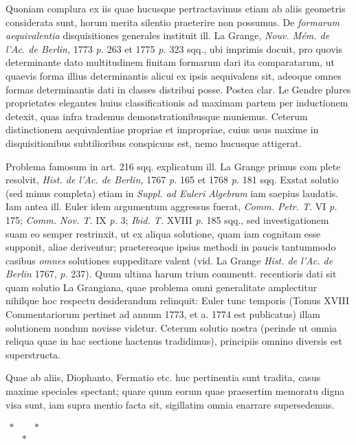 Quoniam complura ex iis quae hucusque pertractavimus etiam ab aliis geometris
considerata sunt, horum merita silentio praeterire non possumus. De \textit{formarum
aequivalentia} disquisitiones generales instituit ill. La Grange, \textit{Nouv.
M\'em. de l'Ac. de Berlin,} 1773 \textit{p.} 263 et 1775 \textit{p.} 323 sqq.,
ubi imprimis docuit, pro quovis determinante dato multitudinem finitam formarum
dari ita comparatarum, ut quaevis forma illius determinantis alicui ex ipsis
aequivalens sit, adeoque omnes formas determinantis dati in classes distribui posse.
Postea clar. Le Gendre plures proprietates elegantes huius classificationis ad
maximam partem per inductionem detexit, quas infra trademus demonstrationibusque
muniemus. Ceterum distinctionem aequivalentiae propriae et impropriae, cuius usus
maxime in disquisitionibus subtilioribus conspicuus est, nemo hucusque attigerat.

Problema famosum in art. 216 sqq. explicatum ill. La Grange primus com%
%
plete resolvit, \textit{Hist. de l'Ac. de Berlin,} 1767 \textit{p.} 165 et
1768 \textit{p.} 181 sqq. Exstat solutio (sed minus completa) etiam in
\textit{Suppl. ad Euleri Algebram} iam saepius laudatis. Iam antea ill. Euler
idem argumentum aggressus fuerat, \textit{Comm. Petr. T.} VI \textit{p.} 175;
\textit{Comm. Nov. T.} IX \textit{p.} 3; \textit{Ibid. T.} XVIII \textit{p.} 185
sqq., sed investigationem suam eo semper restrinxit, ut ex aliqua solutione,
quam iam cognitam esse supponit, aliae deriventur; praetereaque ipsius methodi in
paucis tantummodo casibus \textit{omnes} solutiones suppeditare valent
(vid. La Grange \textit{Hist. de l'Ac. de Berlin} 1767, \textit{p.} 237).
Quum ultima harum trium commentt. recentioris dati sit quam solutio La Grangiana,
quae problema omni generalitate amplectitur nihilque hoc respectu desiderandum
relinquit: Euler tunc temporis (Tomus XVIII Commentariorum pertinet ad annum 1773,
et a. 1774 est publicatus) illam solutionem nondum novisse videtur. Ceterum solutio
nostra (perinde ut omnia reliqua quae in hac sectione hactenus tradidimus),
principiis omnino diversis est superstructa.

Quae ab aliis, Diophanto, Fermatio etc. huc pertinentia sunt tradita, casus maxime
speciales spectant; quare quum eorum quae praesertim memoratu digna visa sunt,
iam supra mentio facta sit, sigillatim omnia enarrare supersedemus.

\begin{center}
$\begin{array}{ccc}\ast&&\ast\\&\ast&\end{array}$
\end{center}

